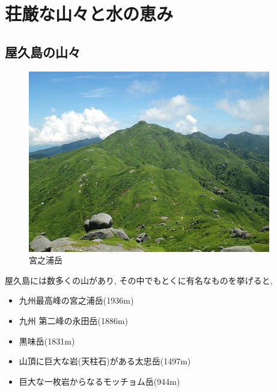 \documentclass[10pt,titlepage,a5paper]{ltjsbook}
\begin{document}
  \section{荘厳な山々と水の恵み}
    \subsection*{屋久島の山々}
      \begin{minipage}{0.38\columnwidth}
      \begin{figure}[H]
        \centering
        \includegraphics[width=\columnwidth]{mt_miyanoura1.jpg}
        \caption{宮之浦岳}
        \label{fig:yakushima_mountains}
      \end{figure}
      \end{minipage}
      \hfill
      \begin{minipage}{0.58\columnwidth}
        屋久島には数多くの山があり, その中でもとくに有名なものを挙げると,
        \begin{itemize}
          \item 九州最高峰の宮之浦岳(1936m)\footnotemark[3]
          \item 九州 第二峰の永田岳(1886m)\footnotemark[3]
          \item 黒味岳(1831m)\footnotemark[3]
          \item 山頂に巨大な岩(天柱石)がある太忠岳(1497m)
          \item 巨大な一枚岩からなるモッチョム岳(944m)
        \end{itemize}
      \end{minipage}
\end{document}
